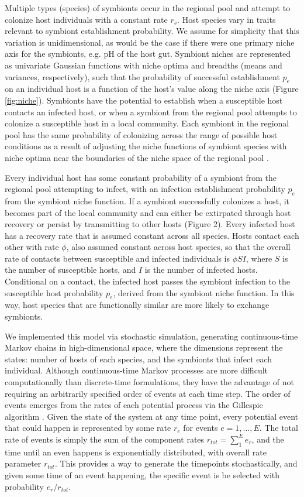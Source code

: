 \documentclass[12pt]{article}
\begin{document}
Multiple types (species) of symbionts occur in the regional pool and attempt to colonize host individuals with a constant rate $r_s$. 
Host species vary in traits relevant to symbiont establishment probability. 
We assume for simplicity that this variation is unidimensional, as would be the case if there were one primary niche axis for the symbionts, e.g. pH of the host gut. 
Symbiont niches are represented as univariate Gaussian functions with niche optima and breadths (means and variances, respectively), such that the probability of successful establishment $p_e$ on an individual host is a function of the host's value along the niche axis (Figure \ref{fig:niche}). 
Symbionts have the potential to establish when a susceptible host contacts an infected host, or when a symbiont from the regional pool attempts to colonize a susceptible host in a local community.
Each symbiont in the regional pool has the same probability of colonizing across the range of possible host conditions as a result of adjusting the niche functions of symbiont species with niche optima near the boundaries of  the niche space of the regional pool \citep{Allouche2012}.
 
Every individual host has some constant probability of a symbiont from the regional pool attempting to infect, with an infection establishment probability $p_e$ from the symbiont niche function. 
If a symbiont successfully colonizes a host, it becomes part of the local community and can either be extirpated through host recovery or persist by transmitting to other hosts (Figure 2). 
Every infected host has a recovery rate that is assumed constant across all species. 
Hosts contact each other with rate $\phi$, also assumed constant across host species, so that the overall rate of contacts between susceptible and infected individuals is $\phi S I$, where $S$ is the number of susceptible hosts, and $I$ is the number of infected hosts.
Conditional on a contact, the infected host passes the symbiont infection to the susceptible host probability $p_e$, derived from the symbiont niche function.
In this way, host species that are functionally similar are more likely to exchange symbionts.

We implemented this model via stochastic simulation, generating continuous-time Markov chains in high-dimensional space, where the dimensions represent the states: number of hosts of each species, and the symbionts that infect each individual. 
Although continuous-time Markov processes are more difficult computationally than discrete-time formulations, they have the advantage of not requiring an arbitrarily specified order of events at each time step. 
The order of events emerges from the rates of each potential process via the Gillespie algorithm \citep{Gillespie1976}. 
Given the state of the system at any time point, every potential event that could happen is represented by some rate $r_e$ for events $e = 1, ..., E$. 
The total rate of events is simply the sum of the component rates $r_{tot} = \sum_{1}^{E} e_r$, and the time until an even happens is exponentially distributed, with overall rate parameter $r_{tot}$. 
This provides a way to generate the timepoints stochastically, and given some time of an event happening, the specific event is be selected with probability $e_r / r_{tot}$. 
\end{document}
